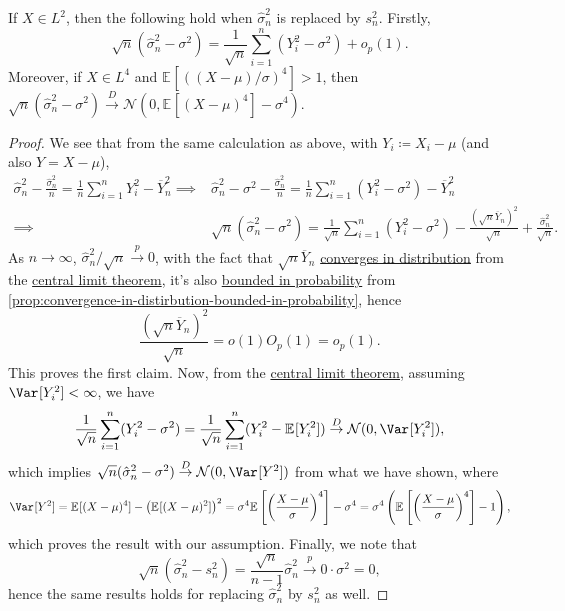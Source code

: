 \begin{proposition}\label{prop:inference-variance}
	If \(X \in L^2\), then the following hold when \(\hat{\sigma} _n^2\) is replaced by \(s_n^2\). Firstly,
	\[
		\sqrt{n} (\hat{\sigma} _n^2 - \sigma ^2)
		= \frac{1}{\sqrt{n} } \sum_{i=1}^{n} (Y_i^2 - \sigma ^2) + o_p(1).
	\]
	Moreover, if \(X \in L^4\) and \(\mathbb{E}_{}[( (X-\mu ) / \sigma ) ^4 ] > 1\), then \(\sqrt{n} (\hat{\sigma} _n^2 - \sigma ^2) \overset{D}{\to} \mathcal{N} (0, \mathbb{E}_{}[(X-\mu )^4 ] - \sigma ^4)\).
\end{proposition}
\begin{proof}
	We see that from the same calculation as above, with \(Y_i \coloneqq X_i - \mu \) (and also \(Y = X - \mu \)),
	\[
		\begin{split}
			\hat{\sigma} _n^2 - \frac{\hat{\sigma} _n^2}{n} = \frac{1}{n} \sum_{i=1}^{n} Y_i^2 - \overline{Y} _n^2
			\implies & \hat{\sigma} _n^2 - \sigma ^2 - \frac{\hat{\sigma} _n^2}{n} = \frac{1}{n} \sum_{i=1}^{n} (Y_i^2 - \sigma ^2)- \overline{Y} _n^2                                                           \\
			\implies & \sqrt{n}(\hat{\sigma } _n^2 - \sigma ^2) = \frac{1}{\sqrt{n} } \sum_{i=1}^{n} (Y_i^2 - \sigma ^2) - \frac{(\sqrt{n} \overline{Y} _n)^2}{\sqrt{n} } + \frac{\hat{\sigma} _n^2}{\sqrt{n} }.
		\end{split}
	\]
	As \(n \to \infty \), \(\hat{\sigma} _n^2 / \sqrt{n} \overset{p}{\to } 0\), with the fact that \(\sqrt{n} \overline{Y} _n\) \hyperref[def:converge-in-distribution]{converges in distribution} from the \hyperref[thm:CLT]{central limit theorem}, it's also \hyperref[def:bounded-in-probability]{bounded in probability} from \autoref{prop:convergence-in-distirbution-bounded-in-probability}, hence
	\[
		\frac{(\sqrt{n} \overline{Y} _n) ^2}{\sqrt{n} }
		= o(1) O_p(1)
		= o_p(1).
	\]
	This proves the first claim. Now, from the \hyperref[thm:CLT]{central limit theorem}, assuming \(\Var_{}[Y_i^2] < \infty \), we have
	\[
		\frac{1}{\sqrt{n} } \sum_{i=1}^{n} (Y_i^2 - \sigma ^2)
		= \frac{1}{\sqrt{n} } \sum_{i=1}^{n} (Y_i^2 - \mathbb{E}_{}[Y_i^2] )
		\overset{D}{\to } \mathcal{N} (0, \Var_{}[Y_i^2] ),
	\]
	which implies \(\sqrt{n} (\hat{\sigma} _n^2 - \sigma ^2) \overset{D}{\to } \mathcal{N} (0, \Var_{}[Y^2] )\) from what we have shown, where
	\[
		\Var_{}[Y^2]
		= \mathbb{E}_{}[(X - \mu )^4]  - \left( \mathbb{E}_{}[(X-\mu )^2] \right) ^2
		= \sigma ^4 \mathbb{E}_{}\left[\left( \frac{X-\mu }{\sigma } \right) ^4 \right] - \sigma ^4
		= \sigma ^4 \left( \mathbb{E}_{}\left[\left( \frac{X-\mu }{\sigma } \right) ^4 \right] - 1 \right),
	\]
	which proves the result with our assumption. Finally, we note that
	\[
		\sqrt{n} (\hat{\sigma} _n^2 - s_n^2) = \frac{\sqrt{n} }{n-1} \hat{\sigma} _n^2 \overset{p}{\to} 0 \cdot \sigma ^2 = 0,
	\]
	hence the same results holds for replacing \(\hat{\sigma} _n^2\) by \(s_n^2\) as well.
\end{proof}

